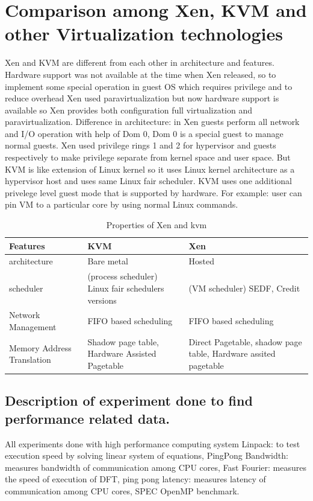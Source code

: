 \documentclass[seminar,twoside]{iitbreport}
\begin{document}
\section{Comparison among Xen, KVM and other Virtualization technologies}
Xen and KVM are different from each other in architecture and features. Hardware support
was not available at the time when Xen released, so to implement some special operation in
guest OS which requires privilege and to reduce overhead Xen used paravirtualization but
now hardware support is available so Xen provides both configuration full virtualization
and paravirtualization. Difference in architecture: in Xen guests perform all network and
I/O operation with help of Dom 0, Dom 0 is a special guest to manage normal guests. 
Xen used privilege rings 1 and 2 for hypervisor and guests respectively to make privilege separate 
from kernel space and user space.
But KVM is like extension of Linux kernel so it uses Linux kernel architecture as a hypervisor
host and uses same Linux fair scheduler.
KVM uses one additional privelege level guest mode that is supported by hardware. 
For example: user can pin VM to a particular core by using normal Linux commands.\\
\begin{table}
\begin{center}
\label{tab-table}
\begin{tabularx}{\textwidth}{|X|X|X|}
\hline
 Features & KVM & Xen \\
\hline
architecture& Bare metal & Hosted \\
\hline
scheduler& (process scheduler) Linux fair schedulers versions& (VM scheduler) SEDF, Credit\\
\hline
Network Management& FIFO based scheduling& FIFO based scheduling\\
\hline
Memory Address Translation& Shadow page table, Hardware Assisted Pagetable&Direct Pagetable, shadow page table, Hardware assited pagetable\\
\hline
\end{tabularx}
\caption {Properties of Xen and kvm\cite{xenkvm2014}}
\end{center}
\end {table}

\subsection{Description of experiment done to find performance related data.}
All experiments done with high performance computing system 
Linpack: to test execution speed by solving linear system of equations, PingPong Bandwidth: 
measures bandwidth of communication among CPU cores, Fast Fourier: measures the
speed of execution of DFT, ping pong latency: measures latency of communication among
CPU cores, SPEC OpenMP benchmark\cite{comparisonm}.
\end{document}
